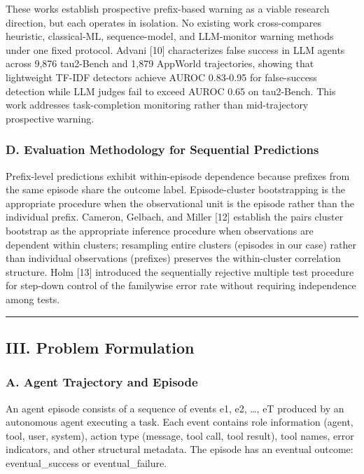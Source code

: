 \documentclass[
]{article}
\begin{document}
These works establish prospective prefix-based warning as a viable
research direction, but each operates in isolation. No existing work
cross-compares heuristic, classical-ML, sequence-model, and LLM-monitor
warning methods under one fixed protocol. Advani {[}10{]} characterizes
false success in LLM agents across 9,876 tau2-Bench and 1,879 AppWorld
trajectories, showing that lightweight TF-IDF detectors achieve AUROC
0.83-0.95 for false-success detection while LLM judges fail to exceed
AUROC 0.65 on tau2-Bench. This work addresses task-completion monitoring
rather than mid-trajectory prospective warning.

\subsubsection{D. Evaluation Methodology for Sequential
Predictions}\label{d.-evaluation-methodology-for-sequential-predictions}

Prefix-level predictions exhibit within-episode dependence because
prefixes from the same episode share the outcome label. Episode-cluster
bootstrapping is the appropriate procedure when the observational unit
is the episode rather than the individual prefix. Cameron, Gelbach, and
Miller {[}12{]} establish the pairs cluster bootstrap as the appropriate
inference procedure when observations are dependent within clusters;
resampling entire clusters (episodes in our case) rather than individual
observations (prefixes) preserves the within-cluster correlation
structure. Holm {[}13{]} introduced the sequentially rejective multiple
test procedure for step-down control of the familywise error rate
without requiring independence among tests.

\begin{center}\rule{0.5\linewidth}{0.5pt}\end{center}

\subsection{III. Problem Formulation}\label{iii.-problem-formulation}

\subsubsection{A. Agent Trajectory and
Episode}\label{a.-agent-trajectory-and-episode}

An agent episode consists of a sequence of events e1, e2, \ldots, eT
produced by an autonomous agent executing a task. Each event contains
role information (agent, tool, user, system), action type (message, tool
call, tool result), tool names, error indicators, and other structural
metadata. The episode has an eventual outcome: eventual\_success or
eventual\_failure.
\end{document}
